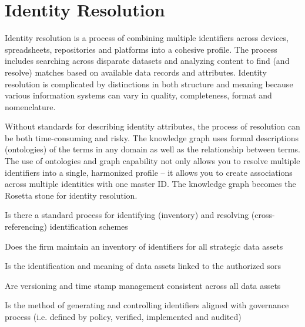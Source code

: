 \section{Identity Resolution}\label{sec:ekgmm-b-2-1} %

Identity resolution is a process of combining multiple identifiers across devices, spreadsheets, repositories and
platforms into a cohesive profile.
The process includes searching across disparate datasets and analyzing content to find (and resolve) matches based
on available data records and attributes.
Identity resolution is complicated by distinctions in both structure and meaning because various information systems
can vary in quality, completeness, format and nomenclature.

\ekgmmContextSection

Without standards for describing identity attributes, the process of resolution can be both time-consuming and risky.
The knowledge graph uses formal descriptions (ontologies) of the terms in any domain as well as the relationship
between terms.
The use of ontologies and graph capability not only allows you to resolve multiple identifiers into a single,
harmonized profile -- it allows you to create associations across multiple identities with one master ID.
The knowledge graph becomes the Rosetta stone for identity resolution.

\kgmmcorequestionssection

\begin{core-questions}

  \item [\thesection.1] Is there a standard process for identifying (inventory) and resolving (cross-referencing)
                        identification schemes
  \item [\thesection.2] Does the firm maintain an inventory of identifiers for all strategic data assets
  \item [\thesection.3] Is the identification and meaning of data assets linked to the authorized \glspl{sor}
  \item [\thesection.4] Are versioning and time stamp management consistent across all data assets
  \item [\thesection.5] Is the method of generating and controlling identifiers aligned with governance process
                        (i.e. defined by policy, verified, implemented and audited)

\end{core-questions}

